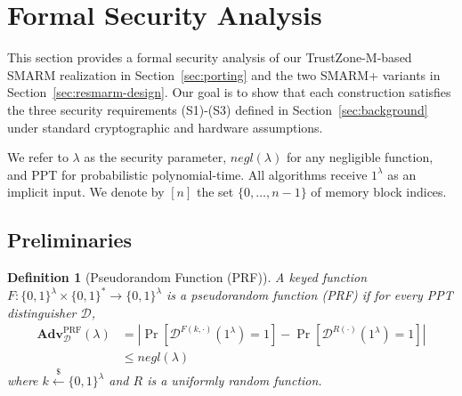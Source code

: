 \documentclass[journal]{IEEEtran}
\newtheorem{definition}{Definition}
\newcommand{\Adv}{\mathbf{Adv}}
\begin{document}






\appendices

\section{Formal Security Analysis}
\label{sec:formal-security}
 
This section provides a formal security analysis of our TrustZone-M-based SMARM realization in Section~\ref{sec:porting} and the two SMARM+ variants in Section~\ref{sec:resmarm-design}.
Our goal is to show that each construction satisfies the three security requirements (S1)-(S3) defined in Section~\ref{sec:background} under standard cryptographic and hardware assumptions.
 
We refer to $\lambda$ as the security parameter, $\mathit{negl}(\lambda)$ for
any negligible function, and PPT for probabilistic polynomial-time.
All algorithms receive $1^{\lambda}$ as an implicit input.
We denote by $[n]$ the set $\{0,\dots,n{-}1\}$ of memory block indices.
 
\subsection{Preliminaries}
\label{sec:prelim}
 
\begin{definition}[Pseudorandom Function (PRF)]
\label{def:prf}
A keyed function $F : \{0,1\}^{\lambda} \times \{0,1\}^{*} \to \{0,1\}^{\lambda}$
is a \emph{pseudorandom function} (PRF) if for every PPT distinguisher
$\mathcal{D}$,
\[
\begin{aligned}
  \Adv^{\mathrm{PRF}}_{\mathcal{D}}(\lambda)
  &=
  \left|
    \Pr\!\left[
      \mathcal{D}^{F(k,\cdot)}(1^{\lambda}) = 1
    \right]
    -
    \Pr\!\left[
      \mathcal{D}^{R(\cdot)}(1^{\lambda}) = 1
    \right]
  \right| \\
  &\leq \mathit{negl}(\lambda)
\end{aligned}
\]
where $k \xleftarrow{\$} \{0,1\}^{\lambda}$ and $R$ is a uniformly random
function.
\end{definition}
 
\end{document}
